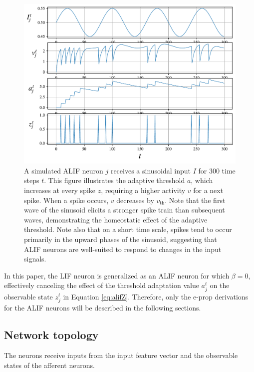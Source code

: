            \begin{figure}[!ht]
                \centering
                \includegraphics[width=\linewidth]{gfx/simplealif}
                \caption[ALIF neuron simulation.]{A simulated ALIF neuron $j$ receives a sinusoidal input $I$ for 300 time steps $t$. This figure illustrates the adaptive threshold $a$, which increases at every spike $z$, requiring a higher activity $v$ for a next spike. When a spike occurs, $v$ decreases by $v_\text{th}$. Note that the first wave of the sinusoid elicits a stronger spike train than subsequent waves, demonstrating the homeostatic effect of the adaptive threshold. Note also that on a short time scale, spikes tend to occur primarily in the upward phases of the sinusoid, suggesting that ALIF neurons are well-suited to respond to changes in the input signals.}
                \label{fig:simplealif}
            \end{figure}

            In this paper, the LIF neuron is generalized as an ALIF neuron for which $\beta=0$, effectively canceling the effect of the threshold adaptation value $a^t_j$ on the observable state $z^t_j$ in Equation \ref{eq:alifZ}.
            Therefore, only the e-prop derivations for the ALIF neurons will be described in the following sections.

    \subsection{Network topology}

        The neurons receive inputs from the input feature vector and the observable states of the afferent neurons.

